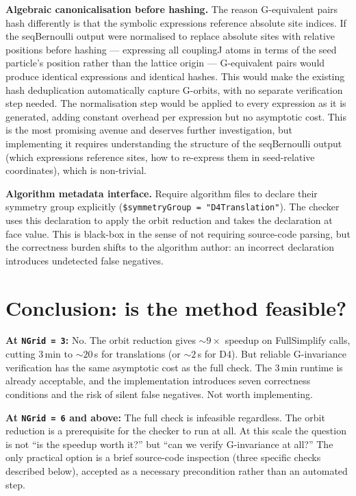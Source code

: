 \documentclass[11pt,a4paper]{article}
\begin{document}
\textbf{Algebraic canonicalisation before hashing.}  The reason
G-equivalent pairs hash differently is that the symbolic expressions
reference absolute site indices.  If the seqBernoulli output were
normalised to replace absolute sites with relative positions before
hashing --- expressing all couplingJ atoms in terms of the seed particle's
position rather than the lattice origin --- G-equivalent pairs would
produce identical expressions and identical hashes.  This would make the
existing hash deduplication automatically capture G-orbits, with no
separate verification step needed.  The normalisation step would be
applied to every expression as it is generated, adding constant overhead
per expression but no asymptotic cost.  This is the most promising avenue
and deserves further investigation, but implementing it requires
understanding the structure of the seqBernoulli output (which
expressions reference sites, how to re-express them in seed-relative
coordinates), which is non-trivial.

\textbf{Algorithm metadata interface.}  Require algorithm files to declare
their symmetry group explicitly (\texttt{\$symmetryGroup = "D4Translation"}).
The checker uses this declaration to apply the orbit reduction and takes
the declaration at face value.  This is black-box in the sense of not
requiring source-code parsing, but the correctness burden shifts to the
algorithm author: an incorrect declaration introduces undetected false
negatives.

\section{Conclusion: is the method feasible?}

\textbf{At \texttt{NGrid\,=\,3}:} No.  The orbit reduction gives
${\sim}9\times$ speedup on FullSimplify calls, cutting 3\,min to
${\sim}20$\,s for translations (or ${\sim}2$\,s for D4).  But reliable
G-invariance verification has the same asymptotic cost as the full check.
The 3\,min runtime is already acceptable, and the implementation introduces
seven correctness conditions and the risk of silent false negatives.  Not
worth implementing.

\textbf{At \texttt{NGrid\,=\,6} and above:}  The full check is infeasible
regardless.  The orbit reduction is a prerequisite for the checker to run
at all.  At this scale the question is not ``is the speedup worth it?''
but ``can we verify G-invariance at all?''  The only practical option is
a brief source-code inspection (three specific checks described below),
accepted as a necessary precondition rather than an automated step.
\end{document}
